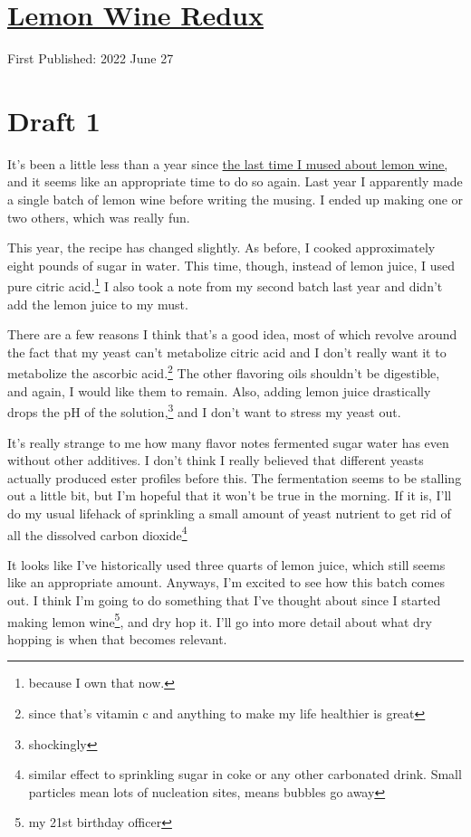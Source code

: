 \documentclass[12pt]{article}[titlepage]
\newcommand{\1}{\={a}}
\newcommand{\2}{\={e}}
\newcommand{\3}{\={\i}}
\newcommand{\4}{\=o}
\newcommand{\5}{\=u}
\newcommand{\6}{\={A}}
\renewcommand{\,}{\textsuperscript{,}}
\begin{document}
\doublespacing
\section{\href{lemon-wine-2.html}{Lemon Wine Redux}}
First Published: 2022 June 27


\section{Draft 1}
It's been a little less than a year since \href{lemon-wine.html}{the last time I mused about lemon wine,} and it seems like an appropriate time to do so again.
Last year I apparently made a single batch of lemon wine before writing the musing.
I ended up making one or two others, which was really fun.

This year, the recipe has changed slightly.
As before, I cooked approximately eight pounds of sugar in water.
This time, though, instead of lemon juice, I used pure citric acid.\footnote{because I own that now.}
I also took a note from my second batch last year and didn't add the lemon juice to my must.

There are a few reasons I think that's a good idea, most of which revolve around the fact that my yeast can't metabolize citric acid and I don't really want it to metabolize the ascorbic acid.\footnote{since that's vitamin c and anything to make my life healthier is great}
The other flavoring oils shouldn't be digestible, and again, I would like them to remain.
Also, adding lemon juice drastically drops the pH of the solution,\footnote{shockingly} and I don't want to stress my yeast out.

It's really strange to me how many flavor notes fermented sugar water has even without other additives.
I don't think I really believed that different yeasts actually produced ester profiles before this.
The fermentation seems to be stalling out a little bit, but I'm hopeful that it won't be true in the morning.
If it is, I'll do my usual lifehack of sprinkling a small amount of yeast nutrient to get rid of all the dissolved carbon dioxide\footnote{similar effect to sprinkling sugar in coke or any other carbonated drink. Small particles mean lots of nucleation sites, means bubbles go away}

It looks like I've historically used three quarts of lemon juice, which still seems like an appropriate amount.
Anyways, I'm excited to see how this batch comes out.
I think I'm going to do something that I've thought about since I started making lemon wine\footnote{my 21st birthday officer}, and dry hop it.
I'll go into more detail about what dry hopping is when that becomes relevant.
\end{document}
